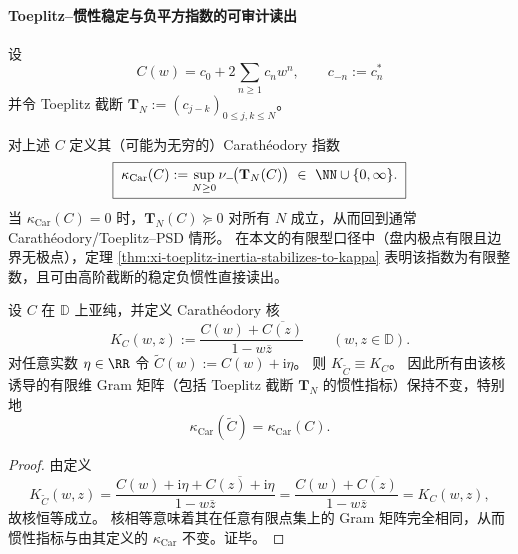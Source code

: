 \paragraph{Toeplitz--惯性稳定与负平方指数的可审计读出}
设
\begin{equation}\label{eq:xi-generalized-carath-series}
\boxed{\;
C(w)=c_0+2\sum_{n\ge 1}c_n w^n,\qquad c_{-n}:=c_n^\ast\;}
\end{equation}
并令 Toeplitz 截断
\(
\mathbf{T}_N:=(c_{j-k})_{0\le j,k\le N}
\)。

\begin{definition}\label{def:xi-generalized-carath-index-toeplitz}
对上述 \(C\) 定义其（可能为无穷的）Carath\'eodory 指数
\begin{equation}\label{eq:xi-carath-index-toeplitz}
\boxed{\;
\kappa_{\mathrm{Car}}(C):=\sup_{N\ge 0}\nu_-\!\bigl(\mathbf{T}_N(C)\bigr)\ \in\ \NN\cup\{0,\infty\}.\;}
\end{equation}
当 \(\kappa_{\mathrm{Car}}(C)=0\) 时，\(\mathbf{T}_N(C)\succeq 0\) 对所有 \(N\) 成立，从而回到通常 Carath\'eodory/Toeplitz--PSD 情形。
在本文的有限型口径中（盘内极点有限且边界无极点），定理 \ref{thm:xi-toeplitz-inertia-stabilizes-to-kappa} 表明该指数为有限整数，且可由高阶截断的稳定负惯性直接读出。
\end{definition}

\begin{proposition}\label{prop:xi-carath-imag-constant-invisible}
设 \(C\) 在 \(\mathbb{D}\) 上亚纯，并定义 Carath\'eodory 核
\[
K_C(w,z):=\frac{C(w)+\overline{C(z)}}{1-w\overline z}\qquad(w,z\in\mathbb{D}).
\]
对任意实数 \(\eta\in\RR\) 令 \(\widetilde C(w):=C(w)+\mathrm{i}\eta\)。
则 \(K_{\widetilde C}\equiv K_C\)。
因此所有由该核诱导的有限维 Gram 矩阵（包括 Toeplitz 截断 \(\mathbf{T}_N\) 的惯性指标）保持不变，特别地
\[
\kappa_{\mathrm{Car}}(\widetilde C)=\kappa_{\mathrm{Car}}(C).
\]
\end{proposition}
\begin{proof}
由定义
\[
K_{\widetilde C}(w,z)=\frac{C(w)+\mathrm{i}\eta+\overline{C(z)+\mathrm{i}\eta}}{1-w\overline z}
=\frac{C(w)+\overline{C(z)}}{1-w\overline z}
=K_C(w,z),
\]
故核恒等成立。
核相等意味着其在任意有限点集上的 Gram 矩阵完全相同，从而惯性指标与由其定义的 \(\kappa_{\mathrm{Car}}\) 不变。证毕。
\end{proof}

